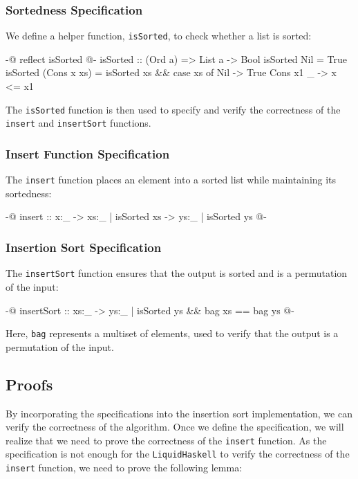 \documentclass[]{rptuseminar}
\begin{document}
\subsubsection{Sortedness Specification}

We define a helper function, \texttt{isSorted}, to check whether a list is sorted:

\begin{haskell}
{-@ reflect isSorted @-}
isSorted :: (Ord a) => List a -> Bool
isSorted Nil = True
isSorted (Cons x xs) =
  isSorted xs && case xs of
    Nil        -> True
    Cons x1 _  -> x <= x1
\end{haskell}

The \texttt{isSorted} function is then used to specify and verify the correctness of the \texttt{insert} and \texttt{insertSort} functions.

\subsubsection{Insert Function Specification}

The \texttt{insert} function places an element into a sorted list while maintaining its sortedness:

\begin{haskell}
{-@ insert :: x:_ -> {xs:_ | isSorted xs} -> {ys:_ | isSorted ys} @-}
\end{haskell}

\subsubsection{Insertion Sort Specification}

The \texttt{insertSort} function ensures that the output is sorted and is a permutation of the input:

\begin{haskell}
{-@ insertSort :: xs:_ -> {ys:_ | isSorted ys && bag xs == bag ys} @-}
\end{haskell}

Here, \texttt{bag} represents a multiset of elements, used to verify that the output is a permutation of the input.

\subsection{Proofs}
By incorporating the specifications into the insertion sort implementation, we can verify the correctness of the algorithm.
Once we define the specification, we will realize that we need to prove the correctness of the \texttt{insert} function.
As the specification is not enough for the \texttt{LiquidHaskell} to verify the correctness of the \texttt{insert} function, we need to prove the following lemma:
\end{document}

